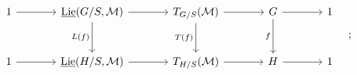 \[\begin{tikzcd}[column sep=large,row sep=large]
1 \arrow[r] & \underline{\operatorname{Lie}}(G/S,\mathcal M) \arrow[r] \arrow[d,"L(f)"'] & T_{G/S}(\mathcal M) \arrow[r] \arrow[d,"T(f)"'] & G \arrow[r] \arrow[d,"f"'] & 1\\
1 \arrow[r] & \underline{\operatorname{Lie}}(H/S,\mathcal M) \arrow[r] & T_{H/S}(\mathcal M) \arrow[r] & H \arrow[r] & 1
\end{tikzcd}\quad ;\]
